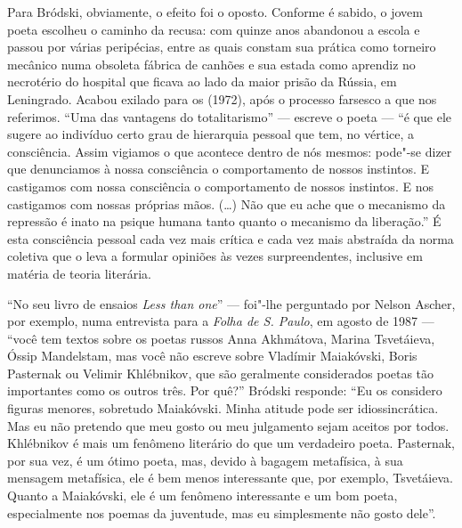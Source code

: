 Para Bródski, obviamente, o efeito foi o oposto. Conforme é sabido, o jovem
poeta escolheu o caminho da recusa: com quinze anos abandonou a escola
e passou por várias peripécias, entre as quais constam sua prática como
torneiro mecânico numa obsoleta fábrica de canhões e sua estada como aprendiz no
necrotério do hospital que ficava ao lado da maior prisão da Rússia, em
Leningrado. Acabou exilado para os  (1972), após o processo
farsesco a que nos referimos. ``Uma das vantagens do totalitarismo'' ---
escreve o poeta --- ``é que ele sugere ao indivíduo certo grau de
hierarquia pessoal que tem, no vértice, a consciência. Assim vigiamos o
que acontece dentro de nós mesmos: pode"-se dizer que denunciamos à nossa
consciência o comportamento de nossos instintos. E castigamos com nossa
consciência o comportamento de nossos instintos. E nos castigamos com
nossas próprias mãos. (\ldots{}) Não que eu ache que o mecanismo da repressão
é inato na psique humana tanto quanto o mecanismo da liberação.'' É esta
consciência pessoal cada vez mais crítica e cada vez mais abstraída da
norma coletiva que o leva a formular opiniões às vezes surpreendentes,
inclusive em matéria de teoria literária.

``No seu livro de ensaios \emph{Less than one}'' --- foi"-lhe perguntado
por Nelson Ascher, por exemplo, numa entrevista para a \emph{Folha de S. Paulo},
em agosto de 1987 --- ``você tem textos sobre os poetas russos Anna
Akhmátova, Marina Tsvetáieva, Óssip Mandelstam, mas você não escreve sobre Vladímir Maiakóvski, Boris Pasternak ou Velimir Khlébnikov, que são geralmente considerados poetas tão importantes como os outros três.
Por quê?'' Bródski responde: ``Eu os considero figuras menores, sobretudo Maiakóvski. Minha atitude pode ser idiossincrática. Mas eu não pretendo que meu gosto ou
meu julgamento sejam aceitos por todos. Khlébnikov é mais um fenômeno
literário do que um verdadeiro poeta. Pasternak, por sua vez, é um ótimo
poeta, mas, devido à bagagem metafísica, à sua mensagem metafísica, ele é
bem menos interessante que, por exemplo, Tsvetáieva. Quanto a
Maiakóvski, ele é um fenômeno interessante e um bom poeta, especialmente
nos poemas da juventude, mas eu simplesmente não gosto dele''.


